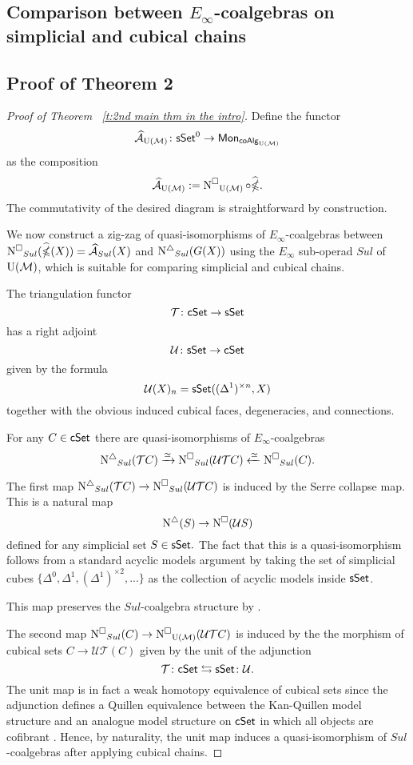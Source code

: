 \subsection{Comparison between $E_{\infty}$-coalgebras on simplicial and cubical chains}


\subsection{Proof of Theorem 2}

\begin{proof}[Proof of Theorem ~\ref{t:2nd main thm in the intro}]
Define the functor $$\widehat{\mathcal{A}}_{{\mathrm{U}(\mathcal{M})}} \colon \mathsf{sSet}^0 \to \mathsf{Mon}_{\mathsf{coAlg}_{{\mathrm{U}(\mathcal{M})}}}$$ as the composition $$\widehat{\mathcal{A}}_{{\mathrm{U}(\mathcal{M})}} := \operatorname{N^{\square}}_{{\mathrm{U}(\mathcal{M})}} \circ \widehat{\operatorname{\mathbb{\Omega}}}.$$ The commutativity of the desired diagram is straightforward by construction. 

We now construct a zig-zag of quasi-isomorphisms of $E_{\infty}$-coalgebras between $\operatorname{N^{\square}}_{Sul}(\widehat{\operatorname{\mathbb{\Omega}}}(X)) = \widehat{\mathcal{A}}_{Sul}(X)$ and $\operatorname{N^{\triangle}}_{Sul} (G(X))$ using the $E_{\infty}$ sub-operad $Sul$ of ${\mathrm{U}(\mathcal{M})}$, which is suitable for comparing simplicial and cubical chains.

The triangulation functor $$\mathcal{T}\colon \mathsf{cSet} \to \mathsf{sSet}$$
has a right adjoint $$\mathcal{U}\colon \mathsf{sSet} \to \mathsf{cSet}$$
given by the formula
$$\mathcal{U}(X)_n= \mathsf{sSet}((\Delta^1)^{\times n}, X)$$
together with the obvious induced cubical faces, degeneracies, and connections. 

For any $C \in \mathsf{cSet}$ there are quasi-isomorphisms of $E_{\infty}$-coalgebras
$$\operatorname{N^{\triangle}}_{Sul}(\mathcal{T}C) \xrightarrow{\simeq} \operatorname{N^{\square}}_{Sul}(\mathcal{U}\mathcal{T}C) \xleftarrow{\simeq} \operatorname{N^{\square}}_{Sul}(C).$$  

The first map $\operatorname{N^{\triangle}}_{Sul}(\mathcal{T}C) \to \operatorname{N^{\square}}_{Sul}(\mathcal{U}\mathcal{T}C)$ is induced by the Serre collapse map. This is a natural map
$$\operatorname{N^{\triangle}}(S) \to \operatorname{N^{\square}}(\mathcal{U}S)$$
defined for any simplicial set $S \in \mathsf{sSet}.$
The fact that this is a quasi-isomorphism follows from a standard acyclic models argument by taking the set of simplicial cubes $\{ \Delta^0, \Delta^1, (\Delta^1)^{\times 2}, ...\}$ as the collection of acyclic models inside $\mathsf{sSet}$. 

This map preserves the $Sul$-coalgebra structure by \cite{medina2021cubical}. 


The second map $\operatorname{N^{\square}}_{Sul}(C) \to \operatorname{N^{\square}}_{{\mathrm{U}(\mathcal{M})}}(\mathcal{U}\mathcal{T}C)$  is induced by the the morphism of cubical sets $C \to \mathcal{U} \mathcal{T} (C)$ given by the unit of the adjunction $$\mathcal{T} \colon \mathsf{cSet} \leftrightarrows \mathsf{sSet} \colon \mathcal{U}.$$ The unit map is in fact a weak homotopy equivalence of cubical sets since the adjunction defines a Quillen equivalence between the Kan-Quillen model structure and an analogue model structure on $\mathsf{cSet}$ in which all objects are cofibrant \cite{cisinski}. Hence, by naturality, the unit map induces a quasi-isomorphism of $Sul$-coalgebras after applying cubical chains. 


\end{proof}
